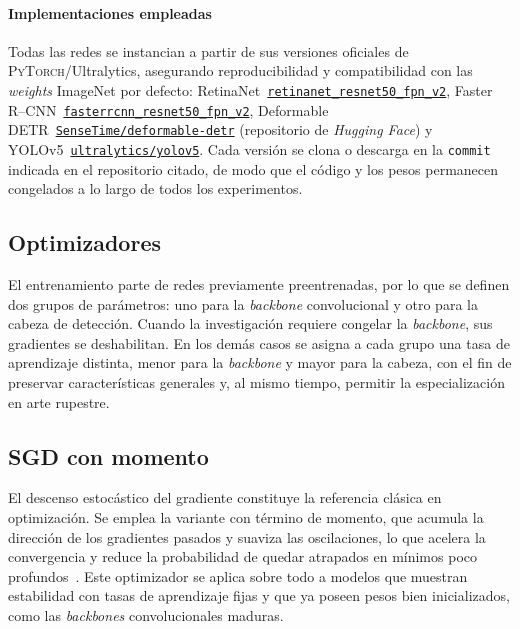 \paragraph{Implementaciones empleadas}
Todas las redes se instancian a partir de sus versiones oficiales de \textsc{PyTorch}/Ultralytics, asegurando reproducibilidad y compatibilidad con las \textit{weights} ImageNet por defecto:
RetinaNet~\href{https://pytorch.org/vision/main/models/generated/torchvision.models.detection.retinanet_resnet50_fpn_v2.html}{\texttt{retinanet\_resnet50\_fpn\_v2}},
Faster\,R--CNN~\href{https://pytorch.org/vision/main/models/generated/torchvision.models.detection.fasterrcnn_resnet50_fpn_v2.html}{\texttt{fasterrcnn\_resnet50\_fpn\_v2}},
Deformable\,DETR~\href{https://huggingface.co/SenseTime/deformable-detr}{\texttt{SenseTime/deformable-detr}} (repositorio de \textit{Hugging Face})
y YOLOv5~\href{https://github.com/ultralytics/yolov5}{\texttt{ultralytics/yolov5}}.
Cada versión se clona o descarga en la \texttt{commit} indicada en el repositorio citado, de modo que el código y los pesos permanecen congelados a lo largo de todos los experimentos.


\subsection{Optimizadores}

El entrenamiento parte de redes previamente preentrenadas, por lo que se definen dos grupos de parámetros: uno para la \emph{backbone} convolucional y otro para la cabeza de detección.
Cuando la investigación requiere congelar la \emph{backbone}, sus gradientes se deshabilitan.
En los demás casos se asigna a cada grupo una tasa de aprendizaje distinta, menor para la \emph{backbone} y mayor para la cabeza, con el fin de preservar características generales y, al mismo tiempo, permitir la especialización en arte rupestre.

\subsection*{SGD con momento}
El descenso estocástico del gradiente constituye la referencia clásica en optimización.
Se emplea la variante con término de momento, que acumula la dirección de los gradientes pasados y suaviza las oscilaciones, lo que acelera la convergencia y reduce la probabilidad de quedar atrapados en mínimos poco profundos~\cite{robbins1951stochastic,qian1999momentum}.
Este optimizador se aplica sobre todo a modelos que muestran estabilidad con tasas de aprendizaje fijas y que ya poseen pesos bien inicializados, como las \emph{backbones} convolucionales maduras.

